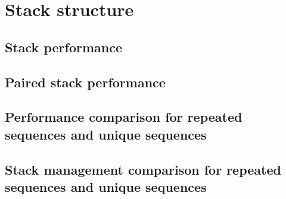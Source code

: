 \section{Stack structure}
\subsection{Stack performance}
\subsection{Paired stack performance}
\subsection{Performance comparison for repeated sequences and unique sequences}
\subsection{Stack management comparison for repeated sequences and unique sequences}
